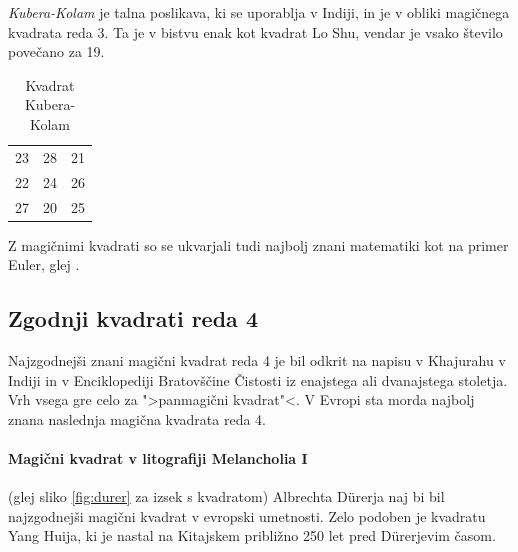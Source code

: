 \documentclass[a4paper,12pt]{article}
\newenvironment{magic}[3]
{
  \begin{table}[!ht]
  \centering
  \caption{#2}    
  \label{#3}      
  \begin{tabular}{|*{3}{c|}}
  \hline
}
{
  \hline
  \end{tabular}
  \end{table}
}
\theoremstyle{definition}
\theoremstyle{plain}
\begin{document}
\emph{Kubera-Kolam} je talna poslikava, ki se uporablja v Indiji, in je v
obliki magičnega kvadrata reda 3. Ta je v bistvu enak kot kvadrat
Lo Shu, vendar je vsako število povečano za 19.

\begin{magic}{3}{Kvadrat Kubera-Kolam}{table:kubera}
23 & 28 & 21 \\
22 & 24 & 26 \\
27 & 20 & 25 \\
\end{magic}
Z magičnimi kvadrati so se ukvarjali tudi najbolj znani matematiki kot na
primer Euler, glej \cite{euler}.


\subsection{Zgodnji kvadrati reda 4}

Najzgodnejši znani magični kvadrat reda 4 je bil odkrit na napisu
v Khajurahu v Indiji in v Enciklopediji Bratovščine Čistosti iz enajstega
ali dvanajstega stoletja. Vrh vsega gre celo za ">panmagični kvadrat"<.
V Evropi sta morda najbolj znana naslednja magična kvadrata reda 4.

\paragraph{Magični kvadrat v litografiji Melancholia I}
(glej sliko \ref{fig:durer}
za izsek s kvadratom) Albrechta Dürerja naj bi bil najzgodnejši magični kvadrat
v evropski umetnosti. Zelo podoben je kvadratu Yang Huija, ki je nastal na Kitajskem
približno 250 let pred Dürerjevim časom. %
\end{document}
